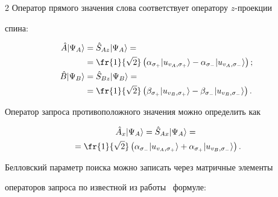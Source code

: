 \begin{multicols}{2}
Оператор прямого значения слова соответствует оператору $z$-про\-ек\-ции 


спина: 


    \begin{align*}


    \hat{A}\vert \Psi_A\rangle &= \hat{S}_{Az} \vert \Psi_A\rangle 


={}\notag\\


&{}=\fr{1}{\sqrt{2}}\left( \alpha_{\sigma_+} \vert u_{v_A,\sigma_+}\rangle -


\alpha_{\sigma_-} \vert u_{v_A,\sigma_-}\rangle\right);




   \\


    \hat{B}\vert \Psi_B\rangle &= \hat{S}_{Bz} \vert \Psi_B\rangle 


={}\notag\\


&{}=\fr{1}{\sqrt{2}}\left( \beta_{\sigma_+} \vert u_{v_B,\sigma_+}\rangle -


\beta_{\sigma_-} \vert u_{v_B,\sigma_-}\rangle\right).




    \end{align*}


    


    Оператор запроса противоположного значения можно определить как


    \begin{multline*}


    \hat{A}_x\vert \Psi_A\rangle = \hat{S}_{Ax} \vert \Psi_A\rangle 


={}\\


{}= \fr{1}{\sqrt{2}}\left( \alpha_{\sigma_-}\vert u_{v_A,\sigma_+}\rangle 


+\alpha_{\sigma_+}\vert u_{v_B,\sigma_-}\rangle\right).




    \end{multline*}


    


    Белловский параметр поиска можно записать через матричные элементы 


операторов запроса по известной из работы~\cite{6-an} формуле:



\end{multicols}
